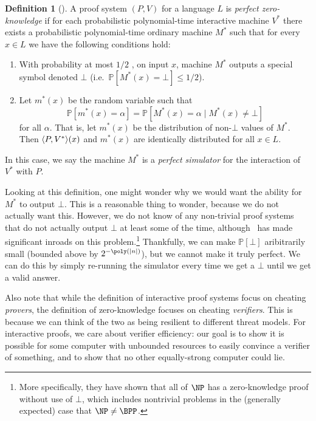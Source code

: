 \documentclass[english,12pt]{reedthesis}
\theoremstyle{plain}
\theoremstyle{definition}
\newtheorem{defn}[defn]{Definition}
\theoremstyle{remark}
\DeclarePairedDelimiter{\abs}{\lvert}{\rvert}
\DeclarePairedDelimiter{\ang}{\langle}{\rangle}
\begin{document}
\begin{defn}[{\cite[Def.\ 4.3.1]{Go01}}]\label{def:zero-knowledge}%
  A proof system $(P, V)$ for a language $L$ is \emph{perfect zero-knowledge} if
  for each probabilistic polynomial-time interactive machine $V^{*}$ there
  exists a probabilistic polynomial-time ordinary machine $M^{*}$ such that for
  every $x \in L$ we have the following conditions hold:
  \begin{enumerate}
    \item With probability at most $1/2$ , on input $x$, machine $M^{*}$ outputs
          a special symbol denoted $\bot$ (i.e.\ $\mathbb{P}[M^{*}(x) = \bot] \le 1/2$).
    \item Let $m^{*}(x)$ be the random variable such that
          \begin{equation}
            \mathbb{P}[m^{*}(x) = \alpha] = \mathbb{P}[M^{*}(x) = \alpha \mid M^{*}(x) \ne \bot]
          \end{equation}
          for all $\alpha$. That is, let $m^{*}(x)$ be the distribution of non-$\bot$
          values of $M^{*}$. Then $\ang{P, V^{*}}(x)$ and $m^{*}(x)$ are
          identically distributed for all $x \in L$.
  \end{enumerate}
  In this case, we say the machine $M^{*}$ is a \emph{perfect simulator} for the
  interaction of $V^{*}$ with $P$.
\end{defn}

Looking at this definition, one might wonder why we would want the ability for
$M^{*}$ to output $\bot$. This is a reasonable thing to wonder, because we do not
actually want this. However, we do not know of any non-trivial proof systems
that do not actually output $\bot$ at least some of the time, although~\cite{GT20}
has made significant inroads on this problem.\footnote{More specifically, they
  have shown that all of $\NP$ has a zero-knowledge proof without use of $\bot$,
  which includes nontrivial problems in the (generally expected) case that
  $\NP \ne \BPP$.} Thankfully, we can make $\mathbb{P}[\bot]$ aribitrarily small (bounded
above by $2^{-\poly(\abs{n})}$), but we cannot make it truly perfect. We can do
this by simply re-running the simulator every time we get a $\bot$ until we get a
valid answer.

Also note that while the definition of interactive proof systems focus on
cheating \emph{provers}, the definition of zero-knowledge focuses on cheating
\emph{verifiers}. This is because we can think of the two as being resilient to
different threat models. For interactive proofs, we care about verifier
efficiency: our goal is to show it is possible for some computer with unbounded
resources to easily convince a verifier of something, and to show that no other
equally-strong computer could lie.
\end{document}
